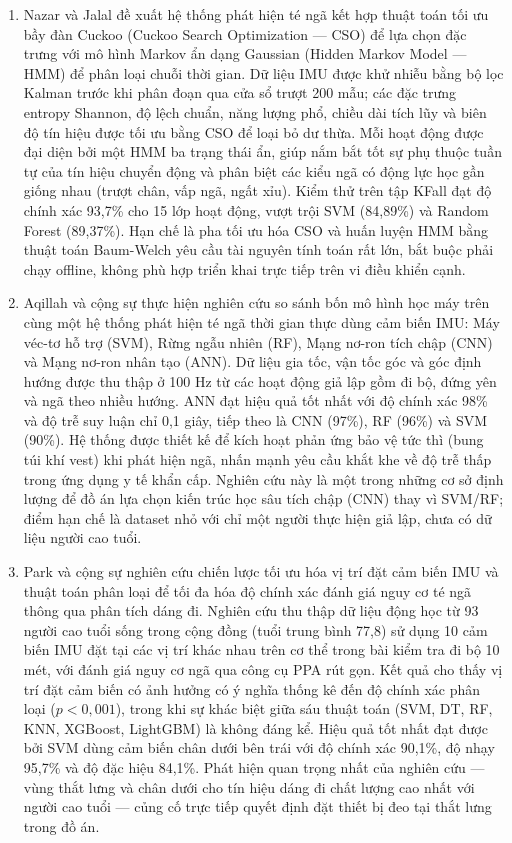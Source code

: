 \documentclass[../DoAn.tex]{subfiles}
\begin{document}
\begin{enumerate}[label=\arabic*)]

\item Nazar và Jalal \cite{nazar2025csohm} đề xuất hệ thống phát hiện té ngã kết hợp thuật toán tối ưu bầy đàn Cuckoo (Cuckoo Search Optimization --- CSO) để lựa chọn đặc trưng với mô hình Markov ẩn dạng Gaussian (Hidden Markov Model --- HMM) để phân loại chuỗi thời gian. Dữ liệu IMU được khử nhiễu bằng bộ lọc Kalman trước khi phân đoạn qua cửa sổ trượt 200 mẫu; các đặc trưng entropy Shannon, độ lệch chuẩn, năng lượng phổ, chiều dài tích lũy và biên độ tín hiệu được tối ưu bằng CSO để loại bỏ dư thừa. Mỗi hoạt động được đại diện bởi một HMM ba trạng thái ẩn, giúp nắm bắt tốt sự phụ thuộc tuần tự của tín hiệu chuyển động và phân biệt các kiểu ngã có động lực học gần giống nhau (trượt chân, vấp ngã, ngất xỉu). Kiểm thử trên tập KFall đạt độ chính xác 93,7\% cho 15 lớp hoạt động, vượt trội SVM (84,89\%) và Random Forest (89,37\%). Hạn chế là pha tối ưu hóa CSO và huấn luyện HMM bằng thuật toán Baum-Welch yêu cầu tài nguyên tính toán rất lớn, bắt buộc phải chạy offline, không phù hợp triển khai trực tiếp trên vi điều khiển cạnh.

\item Aqillah và cộng sự \cite{aqillah2024comparative} thực hiện nghiên cứu so sánh bốn mô hình học máy trên cùng một hệ thống phát hiện té ngã thời gian thực dùng cảm biến IMU: Máy véc-tơ hỗ trợ (SVM), Rừng ngẫu nhiên (RF), Mạng nơ-ron tích chập (CNN) và Mạng nơ-ron nhân tạo (ANN). Dữ liệu gia tốc, vận tốc góc và góc định hướng được thu thập ở 100 Hz từ các hoạt động giả lập gồm đi bộ, đứng yên và ngã theo nhiều hướng. ANN đạt hiệu quả tốt nhất với độ chính xác 98\% và độ trễ suy luận chỉ 0,1 giây, tiếp theo là CNN (97\%), RF (96\%) và SVM (90\%). Hệ thống được thiết kế để kích hoạt phản ứng bảo vệ tức thì (bung túi khí vest) khi phát hiện ngã, nhấn mạnh yêu cầu khắt khe về độ trễ thấp trong ứng dụng y tế khẩn cấp. Nghiên cứu này là một trong những cơ sở định lượng để đồ án lựa chọn kiến trúc học sâu tích chập (CNN) thay vì SVM/RF; điểm hạn chế là dataset nhỏ với chỉ một người thực hiện giả lập, chưa có dữ liệu người cao tuổi.

\item Park và cộng sự \cite{park2025fallrisk} nghiên cứu chiến lược tối ưu hóa vị trí đặt cảm biến IMU và thuật toán phân loại để tối đa hóa độ chính xác đánh giá nguy cơ té ngã thông qua phân tích dáng đi. Nghiên cứu thu thập dữ liệu động học từ 93 người cao tuổi sống trong cộng đồng (tuổi trung bình 77,8) sử dụng 10 cảm biến IMU đặt tại các vị trí khác nhau trên cơ thể trong bài kiểm tra đi bộ 10 mét, với đánh giá nguy cơ ngã qua công cụ PPA rút gọn. Kết quả cho thấy vị trí đặt cảm biến có ảnh hưởng có ý nghĩa thống kê đến độ chính xác phân loại ($p < 0{,}001$), trong khi sự khác biệt giữa sáu thuật toán (SVM, DT, RF, KNN, XGBoost, LightGBM) là không đáng kể. Hiệu quả tốt nhất đạt được bởi SVM dùng cảm biến chân dưới bên trái với độ chính xác 90,1\%, độ nhạy 95,7\% và độ đặc hiệu 84,1\%. Phát hiện quan trọng nhất của nghiên cứu --- vùng thắt lưng và chân dưới cho tín hiệu dáng đi chất lượng cao nhất với người cao tuổi --- củng cố trực tiếp quyết định đặt thiết bị đeo tại thắt lưng trong đồ án.


\end{enumerate}
\end{document}
